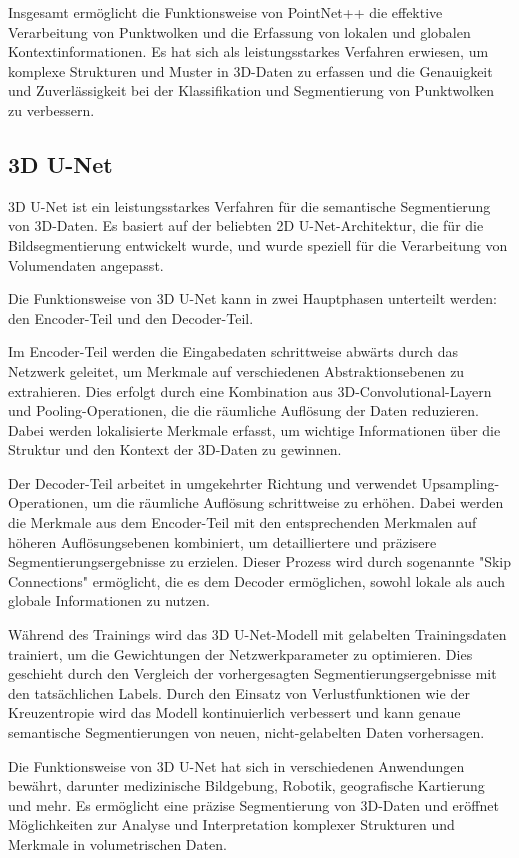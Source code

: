 Insgesamt ermöglicht die Funktionsweise von PointNet++ die effektive
Verarbeitung von Punktwolken und die Erfassung von lokalen und globalen
Kontextinformationen. Es hat sich als leistungsstarkes Verfahren erwiesen, um
komplexe Strukturen und Muster in 3D-Daten zu erfassen und die Genauigkeit und
Zuverlässigkeit bei der Klassifikation und Segmentierung von Punktwolken zu
verbessern.
\subsection{3D U-Net}

3D U-Net ist ein leistungsstarkes Verfahren für die semantische Segmentierung von 3D-Daten. Es basiert auf der beliebten 2D U-Net-Architektur, die für die Bildsegmentierung entwickelt wurde, und wurde speziell für die Verarbeitung von Volumendaten angepasst.

Die Funktionsweise von 3D U-Net kann in zwei Hauptphasen unterteilt werden: den
Encoder-Teil und den Decoder-Teil.

Im Encoder-Teil werden die Eingabedaten schrittweise abwärts durch das Netzwerk
geleitet, um Merkmale auf verschiedenen Abstraktionsebenen zu extrahieren. Dies
erfolgt durch eine Kombination aus 3D-Convolutional-Layern und
Pooling-Operationen, die die räumliche Auflösung der Daten reduzieren. Dabei
werden lokalisierte Merkmale erfasst, um wichtige Informationen über die
Struktur und den Kontext der 3D-Daten zu gewinnen.

Der Decoder-Teil arbeitet in umgekehrter Richtung und verwendet
Upsampling-Operationen, um die räumliche Auflösung schrittweise zu erhöhen.
Dabei werden die Merkmale aus dem Encoder-Teil mit den entsprechenden Merkmalen
auf höheren Auflösungsebenen kombiniert, um detailliertere und präzisere
Segmentierungsergebnisse zu erzielen. Dieser Prozess wird durch sogenannte
"Skip Connections" ermöglicht, die es dem Decoder ermöglichen, sowohl lokale
als auch globale Informationen zu nutzen.

Während des Trainings wird das 3D U-Net-Modell mit gelabelten Trainingsdaten
trainiert, um die Gewichtungen der Netzwerkparameter zu optimieren. Dies
geschieht durch den Vergleich der vorhergesagten Segmentierungsergebnisse mit
den tatsächlichen Labels. Durch den Einsatz von Verlustfunktionen wie der
Kreuzentropie wird das Modell kontinuierlich verbessert und kann genaue
semantische Segmentierungen von neuen, nicht-gelabelten Daten vorhersagen.

Die Funktionsweise von 3D U-Net hat sich in verschiedenen Anwendungen bewährt,
darunter medizinische Bildgebung, Robotik, geografische Kartierung und mehr. Es
ermöglicht eine präzise Segmentierung von 3D-Daten und eröffnet Möglichkeiten
zur Analyse und Interpretation komplexer Strukturen und Merkmale in
volumetrischen Daten.

